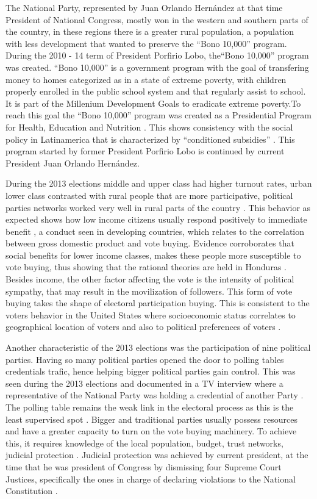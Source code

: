 \documentclass[a4paper,10pt]{article}
\begin{document}
The National Party, represented by Juan Orlando Hernández at that time President of National Congress, mostly won in the western and southern parts of the country, in these regions there is a greater rural population, a population with less development that wanted to preserve the ``Bono 10,000'' program. During the 2010 - 14 term of President Porfirio Lobo, the``Bono 10,000'' program was created. ``Bono 10,000'' is a government program with the goal of transfering money to homes categorized as in a state of extreme poverty, with children properly enrolled in the public school system and that regularly assist to school. It is part of the Millenium Development Goals \citep{mdg2006} to eradicate extreme poverty.To reach this goal the ``Bono 10,000'' program was created as a Presidential Program for Health, Education and Nutrition \citep{bono10k}. This shows consistency with the social policy in Latinamerica that is characterized by ``conditioned subsidies'' \citep{romero2014}. This program started by former President Porfirio Lobo is continued by current President Juan Orlando Hern\'{a}ndez. 

During the 2013 elections middle and upper class had higher turnout rates, urban lower class contrasted with rural people that are more participative, political parties networks worked very well in rural parts of the country \citep{romero2014}. This behavior as expected shows how low income citizens usually respond positively to immediate benefit \citep{kit2000}, a conduct seen in developing countries, which relates to the correlation between gross domestic product and vote buying. Evidence corroborates that social benefits for lower income classes, makes these people more susceptible to vote buying, thus showing that the rational theories are held in Honduras \citep{gonza2014}. Besides income, the other factor affecting the vote is the intensity of political sympathy, that may result in the movilization of followers. This form of vote buying takes the shape of electoral participation buying. This is consistent to the voters behavior in the United States where socioeconomic status correlates to geographical location of voters and also to political preferences of voters \citep{osborn2010}.

Another characteristic of the 2013 elections was the participation of nine political parties. Having so many political parties opened the door to polling tables credentials trafic, hence helping bigger political parties gain control. This was seen during the 2013 elections and documented in a TV interview where a representative of the National Party was holding a credential of another Party \citep{vidap}. The polling table remains the weak link in the electoral process as this is the least supervised spot \citep{romero2014}. Bigger and traditional parties usually possess resources and have a greater capacity to turn on the vote buying machinery. To achieve this, it requires knowledge of the local population, budget, trust networks, judicial protection \citep{gonza2014}. Judicial protection was achieved by current president, at the time that he was president of Congress by dismissing four Supreme Court Justices, specifically the ones in charge of declaring violations to the National Constitution \citep{csj2012}.
\end{document}
